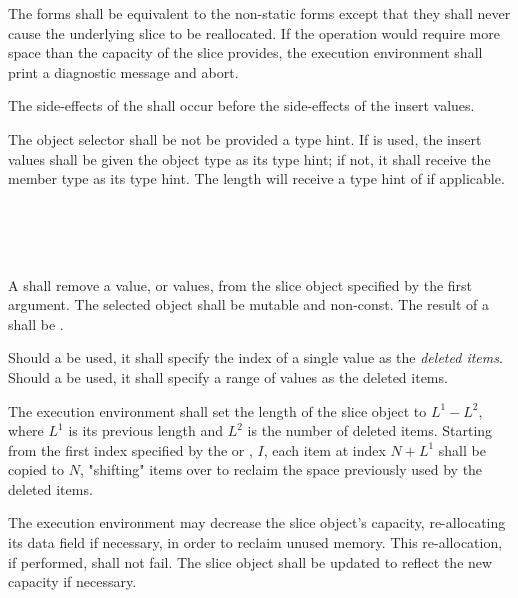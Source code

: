 \specsubsubitem
The  forms shall be equivalent to the non-static forms except
that they shall never cause the underlying slice to be reallocated. If the
operation would require more space than the capacity of the slice provides, the
execution environment shall print a diagnostic message and abort.

\specsubsubitem
The side-effects of the  shall occur before
the side-effects of the insert values.

\specsubsubitem
The object selector shall be not be provided a type hint. If  is
used, the insert values shall be given the object type as its type hint; if
not, it shall receive the member type as its type hint. The length will receive
a type hint of  if applicable.


\begin{grammar}
 \\
	  \terminal{(}  \terminal{)} \\
	  \terminal{(}  \terminal{)} \\
\end{grammar}

\specsubsubitem
A  shall remove a value, or values, from the
slice object specified by the first argument. The selected object shall be
mutable and non-const. The result of a  shall be
.

\specsubsubitem
Should a  be used, it shall specify the index
of a single value as the \textit{deleted items}. Should a
 be used, it shall specify a range of values as
the deleted items.

\specsubsubitem
The execution environment shall set the length of the slice object to $L^1-L^2$,
where $L^1$ is its previous length and $L^2$ is the number of deleted items.
Starting from the first index specified by the
 or , $I$,
each item at index $N+L^1$ shall be copied to $N$, "shifting" items over to
reclaim the space previously used by the deleted items.

\specsubsubitem
The execution environment may decrease the slice object's capacity,
re-allocating its data field if necessary, in order to reclaim unused memory.
This re-allocation, if performed, shall not fail. The slice object shall be
updated to reflect the new capacity if necessary.

